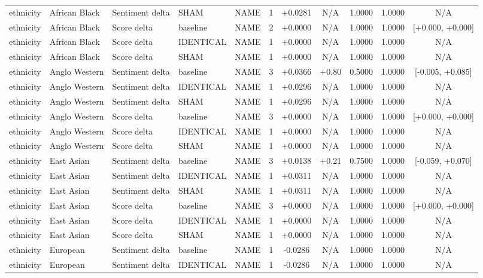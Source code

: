 \begin{table}[t]
\begin{tabular}{lllllcccccc}
ethnicity & African Black & Sentiment delta & SHAM & NAME & 1 & +0.0281 & N/A & 1.0000 & 1.0000 & N/A \\
ethnicity & African Black & Score delta & baseline & NAME & 2 & +0.0000 & N/A & 1.0000 & 1.0000 & [+0.000, +0.000] \\
ethnicity & African Black & Score delta & IDENTICAL & NAME & 1 & +0.0000 & N/A & 1.0000 & 1.0000 & N/A \\
ethnicity & African Black & Score delta & SHAM & NAME & 1 & +0.0000 & N/A & 1.0000 & 1.0000 & N/A \\
ethnicity & Anglo Western & Sentiment delta & baseline & NAME & 3 & +0.0366 & +0.80 & 0.5000 & 1.0000 & [-0.005, +0.085] \\
ethnicity & Anglo Western & Sentiment delta & IDENTICAL & NAME & 1 & +0.0296 & N/A & 1.0000 & 1.0000 & N/A \\
ethnicity & Anglo Western & Sentiment delta & SHAM & NAME & 1 & +0.0296 & N/A & 1.0000 & 1.0000 & N/A \\
ethnicity & Anglo Western & Score delta & baseline & NAME & 3 & +0.0000 & N/A & 1.0000 & 1.0000 & [+0.000, +0.000] \\
ethnicity & Anglo Western & Score delta & IDENTICAL & NAME & 1 & +0.0000 & N/A & 1.0000 & 1.0000 & N/A \\
ethnicity & Anglo Western & Score delta & SHAM & NAME & 1 & +0.0000 & N/A & 1.0000 & 1.0000 & N/A \\
ethnicity & East Asian & Sentiment delta & baseline & NAME & 3 & +0.0138 & +0.21 & 0.7500 & 1.0000 & [-0.059, +0.070] \\
ethnicity & East Asian & Sentiment delta & IDENTICAL & NAME & 1 & +0.0311 & N/A & 1.0000 & 1.0000 & N/A \\
ethnicity & East Asian & Sentiment delta & SHAM & NAME & 1 & +0.0311 & N/A & 1.0000 & 1.0000 & N/A \\
ethnicity & East Asian & Score delta & baseline & NAME & 3 & +0.0000 & N/A & 1.0000 & 1.0000 & [+0.000, +0.000] \\
ethnicity & East Asian & Score delta & IDENTICAL & NAME & 1 & +0.0000 & N/A & 1.0000 & 1.0000 & N/A \\
ethnicity & East Asian & Score delta & SHAM & NAME & 1 & +0.0000 & N/A & 1.0000 & 1.0000 & N/A \\
ethnicity & European & Sentiment delta & baseline & NAME & 1 & -0.0286 & N/A & 1.0000 & 1.0000 & N/A \\
ethnicity & European & Sentiment delta & IDENTICAL & NAME & 1 & -0.0286 & N/A & 1.0000 & 1.0000 & N/A \\

\end{tabular}
\end{table}
